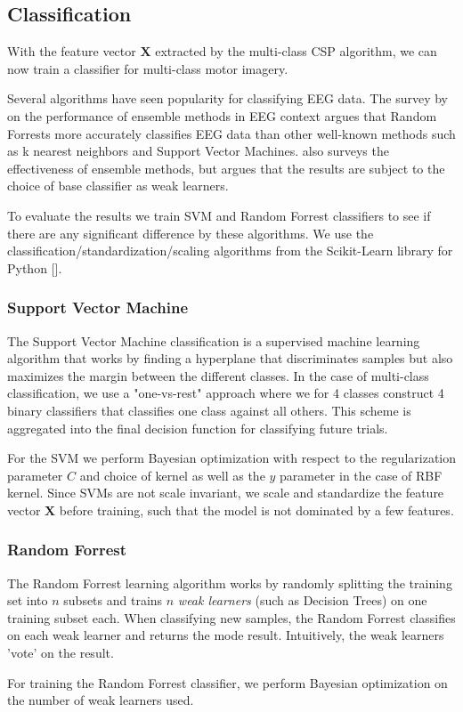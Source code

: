 \subsection{Classification}
With the feature vector $\mathbf{X}$ extracted by the multi-class CSP algorithm, we can now train a classifier for multi-class motor imagery.

Several algorithms have seen popularity for classifying EEG data. The survey by \citet{chan2015systematic} on the performance of ensemble methods in EEG context argues that Random Forrests more accurately classifies EEG data than other well-known methods such as k nearest neighbors and Support Vector Machines. \citet{sun2007experimental} also surveys the effectiveness of ensemble methods, but argues that the results are subject to the choice of base classifier as weak learners.

To evaluate the results we train SVM and Random Forrest classifiers to see if there are any significant difference by these algorithms. We use the classification/standardization/scaling algorithms from the Scikit-Learn library for Python [\cite{scikit-learn}].  

\subsubsection{Support Vector Machine}
The Support Vector Machine classification is a supervised machine learning algorithm that works by finding a hyperplane that discriminates samples but also maximizes the margin between the different classes. In the case of multi-class classification, we use a "one-vs-rest" approach where we for 4 classes construct 4 binary classifiers that classifies one class against all others. This scheme is aggregated into the final decision function for classifying future trials.

For the SVM we perform Bayesian optimization with respect to the regularization parameter $C$ and choice of kernel as well as the $y$ parameter in the case of RBF kernel. Since SVMs are not scale invariant, we scale and standardize the feature vector $\mathbf{X}$ before training, such that the model is not dominated by a few features.

\subsubsection{Random Forrest}
The Random Forrest learning algorithm works by randomly splitting the training set into $n$ subsets and trains $n$ \emph{weak learners} (such as Decision Trees) on one training subset each. When classifying new samples, the Random Forrest classifies on each weak learner and returns the mode result. Intuitively, the weak learners 'vote' on the result.

For training the Random Forrest classifier, we perform Bayesian optimization on the number of weak learners used.